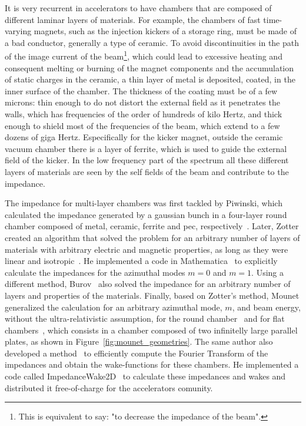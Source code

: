    It is very recurrent in accelerators to have chambers that are composed of different laminar layers of materials. For example, the chambers of fast time-varying magnets, such as the injection kickers of a storage ring, must be made of a bad conductor, generally a type of ceramic. To avoid discontinuities in the path of the image current of the beam\footnote{This is equivalent to say: "to decrease the impedance of the beam".}, which could lead to excessive heating and consequent melting or burning of the magnet components and the accumulation of static charges in the ceramic, a thin layer of metal is deposited, coated, in the inner surface of the chamber. The thickness of the coating must be of a few microns: thin enough to do not distort the external field as it penetrates the walls, which has frequencies of the order of hundreds of kilo Hertz, and thick enough to shield most of the frequencies of the beam, which extend to a few dozens of giga Hertz. Especifically for the kicker magnet, outside the ceramic vacuum chamber there is a layer of ferrite, which is used to guide the external field of the kicker. In the low frequency part of the spectrum all these different layers of materials are seen by the self fields of the beam and contribute to the impedance.

    The impedance for multi-layer chambers was first tackled by Piwinski, which calculated the impedance generated by a gaussian bunch in a four-layer round chamber composed of metal, ceramic, ferrite and \gls{pec}, respectively~\cite{Piwinski}. Later, Zotter created an algorithm that solved the problem for an arbitrary number of layers of materials with arbitrary electric and magnetic properties, as long as they were linear and isotropic~\cite{Zotter1972}. He implemented a code in Mathematica~\cite{Wolfram89} to explicitly calculate the impedances for the azimuthal modes $m=0$ and $m=1$. Using a different method, Burov~\cite{Burov} also solved the impedance for an arbitrary number of layers and properties of the materials. Finally, based on Zotter's method, Mounet generalized the calculation for an arbitrary azimuthal mode, $m$, and beam energy, without the ultra-relativistic assumption, for the round chamber~\cite{Mounet2009} and for flat chambers~\cite{Mounet2010}, which consists in a chamber composed of two infinitelly large parallel plates, as shown in Figure~\ref{fig:mounet_geometries}. The same author also developed a method~\cite{MounetThesis} to efficiently compute the Fourier Transform of the impedances and obtain the wake-functions for these chambers. He implemented a code called ImpedanceWake2D~\cite{Mounet2010c} to calculate these impedances and wakes and distributed it free-of-charge for the accelerators comunity.

